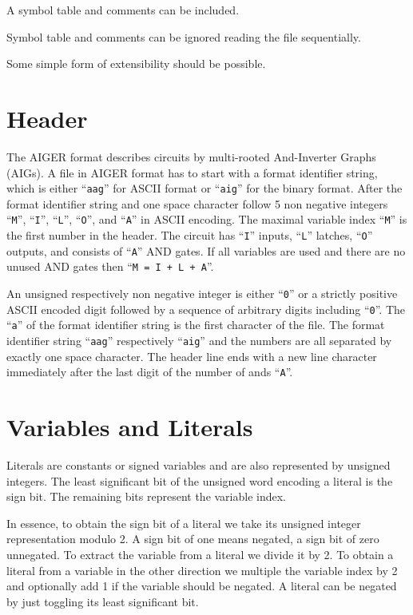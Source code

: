 \documentclass[10pt]{llncs}
\begin{document}
  A symbol table and comments can be included.

  Symbol table and comments can be ignored reading the file sequentially.

  Some simple form of extensibility should be possible.

\section{Header}

  The AIGER format describes circuits by multi-rooted And-Inverter Graphs
  (AIGs).  A file in AIGER format has to start with a format identifier
  string, which is either ``\texttt{aag}'' for ASCII format or ``\texttt{aig}'' for the binary
  format.  After the format identifier string and one space character
  follow 5 non negative integers ``\texttt{M}'', ``\texttt{I}'', ``\texttt{L}'',
  ``\texttt{O}'', and ``\texttt{A}'' in ASCII
  encoding.  The maximal variable index ``\texttt{M}'' is the first number in the
  header.  The circuit has ``\texttt{I}'' inputs, ``\texttt{L}'' latches,
  ``\texttt{O}'' outputs, and
  consists of ``\texttt{A}'' AND gates.  If all variables are used and there are no
  unused AND gates then ``\texttt{M = I + L + A}''.

  An unsigned respectively non negative integer is either ``\texttt{0}'' or a strictly
  positive ASCII encoded digit followed by a sequence of arbitrary digits
  including ``\texttt{0}''.  The ``\texttt{a}'' of the format identifier string is the first
  character of the file.  The format identifier string ``\texttt{aag}'' respectively
  ``\texttt{aig}'' and the numbers are all separated by exactly one space character.
  The header line ends with a new line character immediately after the
  last digit of the number of ands ``\texttt{A}''.

\section{Variables and Literals}

  Literals are constants or signed variables and are also represented by
  unsigned integers.  The least significant bit of the unsigned word
  encoding a literal is the sign bit.  The remaining bits represent the
  variable index.
  
  In essence, to obtain the sign bit of a literal we take its unsigned
  integer representation modulo 2.  A sign bit of one means negated, a sign
  bit of zero unnegated.  To extract the variable from a literal we divide
  it by 2.  To obtain a literal from a variable in the other direction we
  multiple the variable index by 2 and optionally add 1 if the variable
  should be negated.   A literal can be negated by just toggling its least
  significant bit.
  
\end{document}

